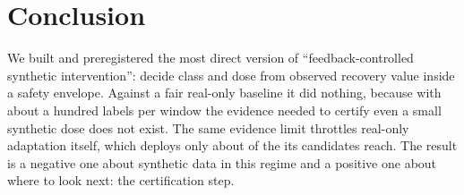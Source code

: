 \documentclass[conference]{IEEEtran}
\begin{document}
\section{Conclusion}
We built and preregistered the most direct version of ``feedback-controlled synthetic intervention'': decide class and dose from observed recovery value inside a safety envelope. Against a fair real-only baseline it did nothing, because with about a hundred labels per window the evidence needed to certify even a small synthetic dose does not exist. The same evidence limit throttles real-only adaptation itself, which deploys only about \RmRealOnlyMean{} of the \ShRealOnlyMean{} its candidates reach. The result is a negative one about synthetic data in this regime and a positive one about where to look next: the certification step.



\end{document}
